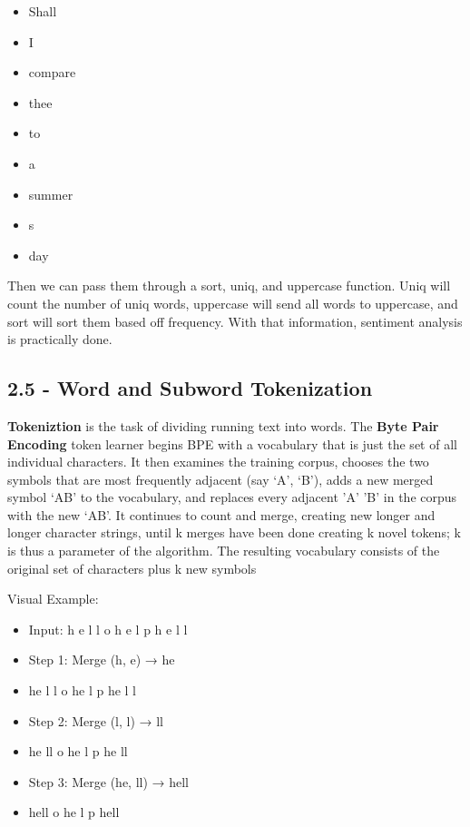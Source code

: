 \documentclass{article}
\begin{document}
\begin{itemize}
    \item Shall
    \item I
    \item compare
    \item thee
    \item to
    \item a
    \item summer
    \item s
    \item day
\end{itemize}

Then we can pass them through a sort, uniq, and uppercase function. Uniq will count the number of uniq words, uppercase will send all words to uppercase,
and sort will sort them based off frequency. With that information, sentiment analysis is practically done.

\subsection{2.5 - Word and Subword Tokenization}

\textbf{Tokeniztion} is the task of dividing running text into words. The \textbf{Byte Pair Encoding} token learner begins BPE
with a vocabulary that is just the set of all individual characters. It then examines the
training corpus, chooses the two symbols that are most frequently adjacent (say ‘A’,
‘B’), adds a new merged symbol ‘AB’ to the vocabulary, and replaces every adjacent
’A’ ’B’ in the corpus with the new ‘AB’. It continues to count and merge, creating
new longer and longer character strings, until k merges have been done creating
k novel tokens; k is thus a parameter of the algorithm. The resulting vocabulary
consists of the original set of characters plus k new symbols

Visual Example:
\begin{itemize}
    \item Input:  h e l l o   h e l p   h e l l
    \item Step 1: Merge (h, e) → he
    \item he l l o   he l p   he l l
    \item Step 2: Merge (l, l) → ll
    \item  he ll o   he l p   he ll
    \item Step 3: Merge (he, ll) → hell
    \item hell o   he l p   hell
\end{itemize}
\end{document}
